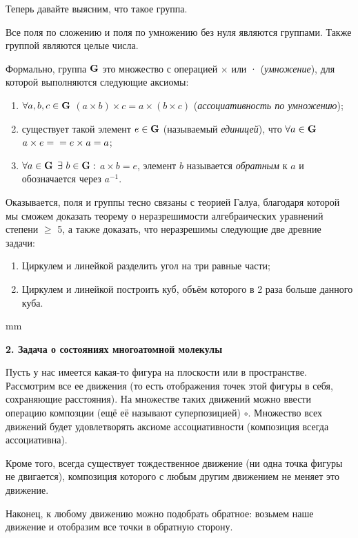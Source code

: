 \documentclass[12pt,english,russian]{article}
\begin{document}
	Теперь давайте выясним, что такое группа.

	Все поля по сложению и поля по умножению без нуля являются группами. Также группой являются целые числа.

	Формально, группа ${\bf G}$ это множество с операцией $\times$ или · (\textit{умножение}), 
	для которой выполняются следующие аксиомы:

	\begin{enumerate}
		\item $\forall a,b,c \in {\bf G}$ $(a\times b)\times c = a\times(b\times c)$ (\textit{ассоциативность по умножению});
		\item существует такой элемент $e \in {\bf G}$ (называемый \textit{единицей}), что $\forall a \in {\bf G}$ $a \times e = \\ = e \times a = a$;
		\item $\forall a \in {\bf G}$ $\exists \ b \in {\bf G}:$ $a \times b = e$, элемент $b$  называется \textit{обратным} к $a$ и обозначается через $a^{-1}$.
	\end{enumerate}

	Оказывается, поля и группы тесно связаны с теорией Галуа,
	благодаря которой мы сможем доказать теорему о неразрешимости 
	алгебраических уравнений степени $\geqslant$ 5, а также доказать,
	что неразрешимы следующие две древние задачи:

	\begin{enumerate}
		\item Циркулем и линейкой разделить угол на три равные части;
		\item Циркулем и линейкой построить куб, объём которого в 2 раза больше данного куба.
	\end{enumerate}
	 mm


	{\bf2. Задача о состояниях многоатомной молекулы}

	Пусть у нас имеется какая-то фигура на плоскости или в пространстве. 
	Рассмотрим все ее движения (то есть отображения
	точек этой фигуры в себя, сохраняющие расстояния). На множестве 
	таких движений можно ввести операцию композции (ещё
	её называют суперпозицией) $\circ$. Множество всех движений будет
	удовлетворять аксиоме ассоциативности (композиция всегда ассоциативна).

	Кроме того, всегда существует тождественное движение (ни
	одна точка фигуры не двигается), композиция которого с любым
	другим движением не меняет это движение.

	Наконец, к любому движению можно подобрать обратное: возьмем 
	наше движение и отобразим все точки в обратную сторону.
\end{document}

